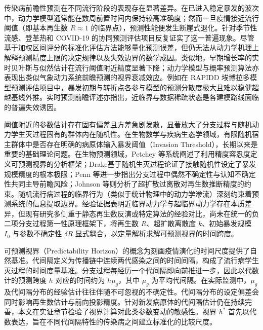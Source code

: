 \documentclass[11pt,a4paper]{article}
\theoremstyle{plain}
\theoremstyle{definition}
\begin{document}
传染病前瞻性预测在不同流行阶段的表现存在显著差异。在已进入稳定暴发的波次中，动力学模型通常能在数周前置时间内保持较高准确度；然而一旦疫情接近流行阈值（即基本再生数 $R \approx 1$ 的临界点），预测性能便发生断崖式退化\citep{scarpino2019predictability, reich2019collaborative}。针对季节性流感、登革热和 COVID-19 的协同预测评估项目\citep{mcgowan2019collaborative, johansson2019open, cramer2022evaluation}反复证实了这一普遍现象。尽管基于加权区间评分的标准化评估方法\citep{bracher2021evaluating}能够量化预测误差，但仍无法从动力学机理上解释预测精度上限的决定规律以及失效边界的数学成因。类似地，早期增长率的实时贝叶斯与似然估计在流行阈值附近精度显著下降\citep{bettencourt2008real, fraser2007estimating}；动力学模型与概率预测算法亦表现出类似气象动力系统前瞻预测的视界衰减效应\citep{moran2016epidemic, castro2020predictability, funk2018realtime, held2017probabilistic}。例如在 RAPIDD 埃博拉多模型预测评估项目中，暴发初期与转折点各参与模型的预测分散度极大且难以稳健超越基线外推\citep{viboud2018rapidd}。实时预测前瞻评述亦指出，近临界与数据稀疏状态是各建模路线面临的普遍失效诱因\citep{desai2019realtime}。

阈值附近的参数估计存在固有偏差且方差急剧发散\citep{britton2019estimation}，显著放大了分支过程与随机动力学生灭过程固有的群体内在随机性\citep{bartlett1957measles, athreya1972branching}。在生物数学与疾病生态学领域，有限随机宿主群体中是否存在明确的病原体输入暴发阈值（Invasion Threshold），长期以来是重要的基础理论问题\citep{lloydsmith2005should}。在生物预测领域，Petchey 等\citep{petchey2015ecological}系统阐述了利用精度容忍度定义可预测视界的分析框架；Drake\citep{drake2006limits}基于随机生灭过程论证了接触随机性设定了暴发规模精度的根本极限；Penn 等\citep{penn2023intrinsic}进一步指出分支过程中偶然不确定性与认知不确定性共同主导前瞻风险；Johnson 等\citep{johnson2021disease}则分析了超扩散过离散对再生数推断精度的约束。随机流行病过程的临界行为（类似于统计物理中的动力学渗流\citep{grassberger1983critical}）深刻约束着预测系统的信息提取边界。经验证据表明近临界动力学与超临界动力学存在本质差异，但现有研究多侧重于静态再生数反演或特定算法的经验对比，尚未在统一的负二项分支过程第一性原理框架下，将再生数 $R$、超扩散离散度 $k$、初始暴发规模 $I_0$ 与参数不确定性 $\delta R$ 显式耦合，以定量解析求解可预测视界的时间跨度。

可预测视界（Predictability Horizon）的概念为刻画疫情演化的时间尺度提供了自然基准。代间隔定义为传播链中连续两代感染之间的时间间隔，构成了流行病学生灭过程的时间度量基准。分支过程每经历一个代间隔即向前推进一步，因此以代数计的预测跨度 $h$ 对应的时间约为 $h \mu_g$，其中 $\mu_g$ 为平均代间隔\citep{wallinga2007generation}。在实际监测中，$\mu_g$ 及代间隔分布的经验估计往往伴随不可忽视的不确定性。代间隔分布的设定偏差会同时影响再生数估计与前向投影精度\citep{park2020forward}。针对新发病原体的代间隔估计仍在持续完善\citep{nishiura2009generation, hakki2022serial}，本文在实证章节检验了视界计算对此类参数变动的敏感性。视界 $h^*$ 首先以代数表达，旨在不同代间隔特性的传染病之间建立标准化的比较尺度。
\end{document}
